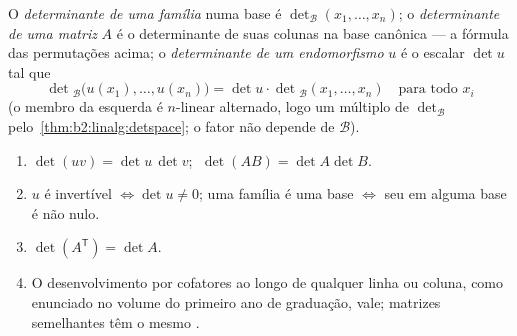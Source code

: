 \begin{definition}[Determinantes]\label{def:b2:linalg:det}
O \emph{determinante de uma família} numa base é
$\det_{\mathcal{B}}(x_1, \dots, x_n)$; o \emph{determinante de uma
matriz} $A$ é o determinante de suas colunas na base canônica
--- a fórmula das permutações acima; o \emph{determinante de um
endomorfismo} $u$ é o escalar $\det u$ tal que
\[
\det{}_{\mathcal{B}}\bigl(u(x_1), \dots, u(x_n)\bigr)
= \det u \cdot \det{}_{\mathcal{B}}(x_1, \dots, x_n)
\quad \text{para todo } x_i
\]
(o membro da esquerda é $n$-linear alternado, logo um múltiplo de
$\det_\mathcal{B}$ pelo~\cref{thm:b2:linalg:detspace}; o fator não
depende de $\mathcal{B}$).
\end{definition}

\begin{theorem}\label{thm:b2:linalg:detrules}
\begin{enumerate}
  \item $\det(uv) = \det u\,\det v$; $\;\det(AB) = \det A \det B$.
  \item $u$ é invertível $\iff \det u \neq 0$; uma família é uma base
        $\iff$ seu  em alguma base é não nulo.
  \item $\det(A^{\mathsf T}) = \det A$.
  \item O desenvolvimento por cofatores ao longo de qualquer linha ou coluna, como enunciado no
        volume do primeiro ano de graduação, vale; matrizes semelhantes têm o mesmo
        .
\end{enumerate}
\end{theorem}

